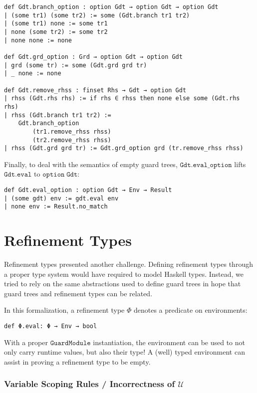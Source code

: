 \begin{verbatim}
def Gdt.branch_option : option Gdt → option Gdt → option Gdt
| (some tr1) (some tr2) := some (Gdt.branch tr1 tr2)
| (some tr1) none := some tr1
| none (some tr2) := some tr2
| none none := none

def Gdt.grd_option : Grd → option Gdt → option Gdt
| grd (some tr) := some (Gdt.grd grd tr)
| _ none := none

def Gdt.remove_rhss : finset Rhs → Gdt → option Gdt
| rhss (Gdt.rhs rhs) := if rhs ∈ rhss then none else some (Gdt.rhs rhs)
| rhss (Gdt.branch tr1 tr2) :=
    Gdt.branch_option
        (tr1.remove_rhss rhss)
        (tr2.remove_rhss rhss)
| rhss (Gdt.grd grd tr) := Gdt.grd_option grd (tr.remove_rhss rhss)
\end{verbatim}

Finally, to deal with the semantics of empty guard trees,
$\mathtt{Gdt.eval\_option}$ lifts $\mathtt{Gdt.eval}$ to $\mathtt{option\;Gdt}$:

\begin{verbatim}
def Gdt.eval_option : option Gdt → Env → Result
| (some gdt) env := gdt.eval env
| none env := Result.no_match
\end{verbatim}

\section{Refinement Types}
\label{sec:formalizationRefinementTypes}

Refinement types presented another challenge.
Defining refinement types through a proper type system would have required to model Haskell types.
Instead, we tried to rely on the same abstractions used to define guard trees in hope that guard trees and refinement types can be related.

In this formalization, a refinement type $\Phi$ denotes a predicate on environments:

\begin{verbatim}
def Φ.eval: Φ → Env → bool
\end{verbatim}

With a proper $\mathtt{GuardModule}$ instantiation, the environment can be used to not only carry runtime values, but also their type!
A (well) typed environment can assist in proving a refinement type to be empty.

\subsubsection{Variable Scoping Rules / Incorrectness of $\mathcal{U}$}
\label{sec:formalizationVariableBindingRules}

